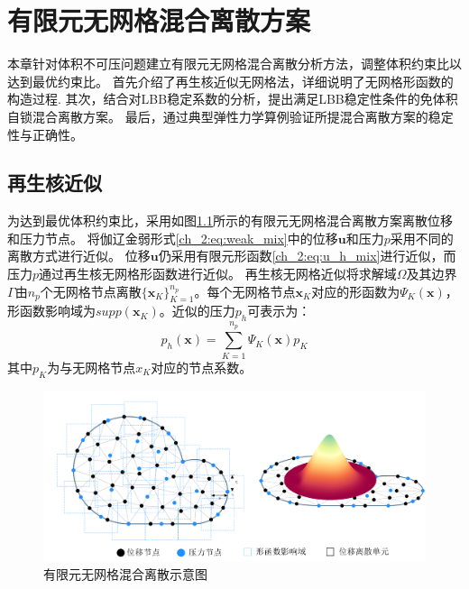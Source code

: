 \chapter{有限元无网格混合离散方案}

本章针对体积不可压问题建立有限元无网格混合离散分析方法，调整体积约束比以达到最优约束比。
首先介绍了再生核近似无网格法，详细说明了无网格形函数的构造过程.
其次，结合对LBB稳定系数的分析，提出满足LBB稳定性条件的免体积自锁混合离散方案。
最后，通过典型弹性力学算例验证所提混合离散方案的稳定性与正确性。
\section{再生核近似}
为达到最优体积约束比，采用如图\ref{ch_4:fig:meshfree}所示的有限元无网格混合离散方案离散位移和压力节点。
将伽辽金弱形式\eqref{ch_2:eq:weak_mix}中的位移$\boldsymbol{u}$和压力$p$采用不同的离散方式进行近似。
位移$\boldsymbol{u}$仍采用有限元形函数\eqref{ch_2:eq:u_h_mix}进行近似，而压力$p$通过再生核无网格形函数进行近似。
再生核无网格近似将求解域$\Omega$及其边界$\Gamma$由$n_p$个无网格节点离散$\{\boldsymbol x_K\}_{K=1}^{n_p}$。每个无网格节点$\boldsymbol x_K$对应的形函数为$\Psi_K(\boldsymbol{x})$，形函数影响域为$supp(\boldsymbol{x}_K)$。近似的压力$p_h$可表示为：
\begin{equation}
    p_h(\boldsymbol x) = \sum_{K=1}^{n_p} \Psi_K(\boldsymbol x) p_K
\end{equation}
其中$p_K$为与无网格节点$x_K$对应的节点系数。
\begin{figure}[H]
    \centering 
        \includegraphics[scale=0.5]{figures/meshfree.png}
        \caption{有限元无网格混合离散示意图}\label{ch_4:fig:meshfree}
\end{figure}

